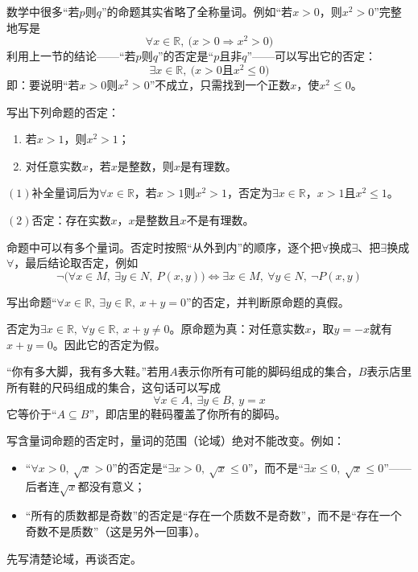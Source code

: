 数学中很多“若$p$则$q$”的命题其实省略了全称量词。例如“若$x>0$，则$x^2>0$”完整地写是
\[\forall x\in\mathbb{R},\ \big(x>0\Rightarrow x^2>0\big)\]
利用上一节的结论——“若$p$则$q$”的否定是“$p$且非$q$”——可以写出它的否定：
\[\exists x\in\mathbb{R},\ \big(x>0\text{且}x^2\leq 0\big)\]
即：要说明“若$x>0$则$x^2>0$”不成立，只需找到一个正数$x$，使$x^2\leq 0$。

\begin{example}
写出下列命题的否定：
\begin{enumerate}
    \item 若$x>1$，则$x^2>1$；
    \item 对任意实数$x$，若$x$是整数，则$x$是有理数。
\end{enumerate}
\end{example}
\begin{jie}
    $(1)$补全量词后为$\forall x\in\mathbb{R}$，若$x>1$则$x^2>1$，否定为$\exists x\in\mathbb{R}$，$x>1$且$x^2\leq 1$。

    $(2)$否定：存在实数$x$，$x$是整数且$x$不是有理数。
\end{jie}

命题中可以有多个量词。否定时按照“从外到内”的顺序，逐个把$\forall$换成$\exists$、把$\exists$换成$\forall$，最后结论取否定，例如
\[\neg\big(\forall x\in M,\ \exists y\in N,\ P(x,y)\big)\iff\exists x\in M,\ \forall y\in N,\ \neg P(x,y)\]

\begin{example}
写出命题“$\forall x\in\mathbb{R},\ \exists y\in\mathbb{R},\ x+y=0$”的否定，并判断原命题的真假。
\end{example}
\begin{jie}
否定为$\exists x\in\mathbb{R},\ \forall y\in\mathbb{R},\ x+y\neq 0$。原命题为真：对任意实数$x$，取$y=-x$就有$x+y=0$。因此它的否定为假。
\end{jie}

\begin{example}
“你有多大脚，我有多大鞋。”若用$A$表示你所有可能的脚码组成的集合，$B$表示店里所有鞋的尺码组成的集合，这句话可以写成
\[\forall x\in A,\ \exists y\in B,\ y=x\]
它等价于“$A\subseteq B$”，即店里的鞋码覆盖了你所有的脚码。
\end{example}

\begin{zhu}
写含量词命题的否定时，量词的范围（论域）绝对不能改变。例如：
\begin{itemize}
    \item “$\forall x>0,\ \sqrt{x}>0$”的否定是“$\exists x>0,\ \sqrt{x}\leq 0$”，而不是“$\exists x\leq 0,\ \sqrt{x}\leq 0$”——后者连$\sqrt{x}$都没有意义；
    \item “所有的质数都是奇数”的否定是“存在一个质数不是奇数”，而不是“存在一个奇数不是质数”（这是另外一回事）。
\end{itemize}
先写清楚论域，再谈否定。
\end{zhu}

